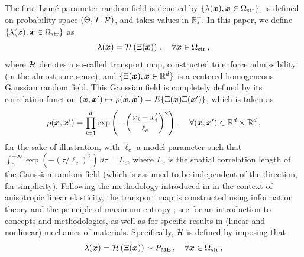 The first Lam\'e parameter random field is denoted by $\{\lambda({\boldsymbol{x}}), {\boldsymbol{x}} \in \Omega_{\text{str}}\}$, is defined on probability space $(\Theta,{\mathcal{T}},{\mathcal{P}})$, and takes values in $\mathbb{R}_*^+$. In this paper, we define $\{\lambda({\boldsymbol{x}}), {\boldsymbol{x}} \in \Omega_{\text{str}}\}$ as 
\begin{equation}
    \lambda({\boldsymbol{x}}) = {\mathcal{H}} \left(\Xi({\boldsymbol{x}})\right)\,, \quad \forall {\boldsymbol{x}} \in \Omega_{\text{str}}\,,
\end{equation}
where ${\mathcal{H}}$ denotes a so-called transport map, constructed to enforce admissibility (in the almost sure sense), and $\{\Xi({\boldsymbol{x}}), {\boldsymbol{x}} \in \mathbb{R}^d\}$ is a centered homogeneous Gaussian random field. This Gaussian field is completely defined by its correlation function $({\boldsymbol{x}}, {\boldsymbol{x}}') \mapsto \rho({\boldsymbol{x}},{\boldsymbol{x}}') = E\{\Xi({\boldsymbol{x}})\Xi({\boldsymbol{x}}')\}$, which is taken as
\begin{equation}
    \rho({\boldsymbol{x}},{\boldsymbol{x}}') = \prod_{i = 1}^d \exp\left(-\left(\frac{x_i - x_i'}{\ell_c}\right)^2 \right)\,, \quad \forall ({\boldsymbol{x}},{\boldsymbol{x}}') \in \mathbb{R}^d \times \mathbb{R}^d\,,
\end{equation}
for the sake of illustration, with $\ell_c$ a model parameter such that $\int_0^{+\infty} \exp\left(-(\tau/\ell_c)^2\right)\,d\tau = L_c$, where $L_c$ is the spatial correlation length of the Gaussian random field (which is assumed to be independent of the direction, for simplicity). Following the methodology introduced in \cite{SOIZE200626} in the context of anisotropic linear elasticity, the transport map is constructed using information theory and the principle of maximum entropy \cite{Shannon1948,Jaynes1957a,Jaynes1957b}; see \cite{Soize-book} for an introduction to concepts and methodologies, as well as \cite{GUILLEMINOT2020385} for specific results in (linear and nonlinear) mechanics of materials. Specifically, ${\mathcal{H}}$ is defined by imposing that
\begin{equation}\label{eq:def-transport}
    \lambda({\boldsymbol{x}}) = {\mathcal{H}} \left(\Xi({\boldsymbol{x}})\right) \sim P_{\text{ME}}\,, \quad \forall {\boldsymbol{x}} \in \Omega_{\text{str}}\,,
\end{equation}
